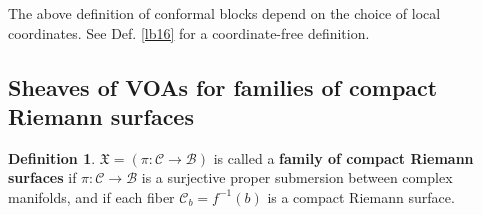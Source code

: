 \documentclass[11pt,b5paper,notitlepage]{article}
\theoremstyle{definition}
\newtheorem{df}{Definition}[section]
\newtheorem{rem}[df]{Remark}
\theoremstyle{plain}
\newcommand{\Vbb}{\mathbb V}
\newcommand{\Wbb}{\mathbb W}
\newcommand{\<}{\left\langle}
\renewcommand{\>}{\right\rangle}
\newcommand{\MC}{\mathcal{C}}
\newcommand{\MB}{\mathcal{B}}
\newcommand{\fx}{\mathfrak{X}}
\numberwithin{equation}{section}
\begin{document}
The above definition of conformal blocks depend on the choice of local coordinates. See Def. \ref{lb16} for a coordinate-free definition.





\begin{comment}
\begin{rem}\label{conformaldefweak}
    Note that the above definition also makes sense when $\Wbb$ is a weak $\Vbb^{\times N}$-module. This is because we have chosen local coordinates at each marked point and we do not need to consider change of coordinate operators with respect to $\Wbb$.
\end{rem}
\end{comment}





\subsection{Sheaves of VOAs for families of compact Riemann surfaces}
\begin{df}
    $\fx=(\pi:\MC\rightarrow \MB)$ is called a \textbf{family of compact Riemann surfaces} if $\pi:\MC\rightarrow \MB$ is a surjective proper submersion between complex manifolds, and if each fiber $\MC_b=f^{-1}(b)$ is a compact Riemann surface.
\end{df}
\end{document}
